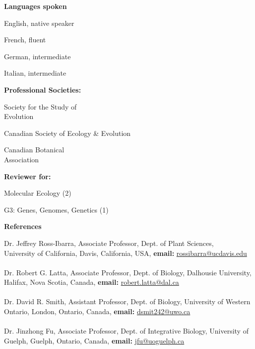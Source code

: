 \documentclass[a4paper,12pt,final]{memoir}
\newcommand{\Sep}{\vspace{1.5em}}
\newcommand{\SmallSep}{\vspace{0.5em}}
\newenvironment{Contact Information}
	{\ignorespaces\textbf{\color{MidnightBlue} Contact Information}}
	{\Sep\ignorespacesafterend}
\newcommand{\CVSection}[1]
	{\Large\textbf{#1}\par
	\SmallSep\normalsize\normalfont}
\newcommand{\CVItem}[1]
	{\textbf{\color{MidnightBlue} #1}}
\begin{document}
\CVItem{Languages spoken}
\begin{multicols}{3}
\begin{compactitem}[\color{MidnightBlue}$\circ$]
	\item English, native speaker
	\item French, fluent 
    \item German, intermediate
    \item Italian, intermediate
\end{compactitem}
\end{multicols}
\Sep

\CVItem{Professional Societies:}
\begin{multicols}{3}
\begin{compactitem}[\color{MidnightBlue}$\circ$]
	\item Society for the Study of\\ Evolution
	\item Canadian Society of Ecology \& Evolution
    \item Canadian Botanical\\ Association
\end{compactitem}
\end{multicols}
\Sep

\CVItem{Reviewer for:}
\begin{multicols}{2}
\begin{compactitem}[\color{MidnightBlue}$\circ$]
	\item Molecular Ecology (2)
	\item G3: Genes, Genomes, Genetics (1)
\end{compactitem}
\end{multicols}
\SmallSep


\CVSection{References}
Dr. Jeffrey Ross-Ibarra, Associate Professor, Dept. of Plant Sciences, \\
University of California, Davis, California, USA, \textbf{email:} \href{rossibarra@ucdavis.edu}{rossibarra@ucdavis.edu}\\
\\Dr. Robert G. Latta, Associate Professor, Dept. of Biology, Dalhousie University, Halifax, Nova Scotia, Canada, \textbf{email:} \href{robert.latta@dal.ca}{robert.latta@dal.ca}\\
\\Dr. David R. Smith, Assistant Professor, Dept. of Biology, University of Western Ontario, London, Ontario, Canada, \textbf{email:} \href{dsmit242@uwo.ca}{dsmit242@uwo.ca}\\
\\Dr. Jinzhong Fu, Associate Professor, Dept. of Integrative Biology, University of Guelph, Guelph, Ontario, Canada, \textbf{email:} \href{jfu@uoguelph.ca}{jfu@uoguelph.ca}


\end{document}
